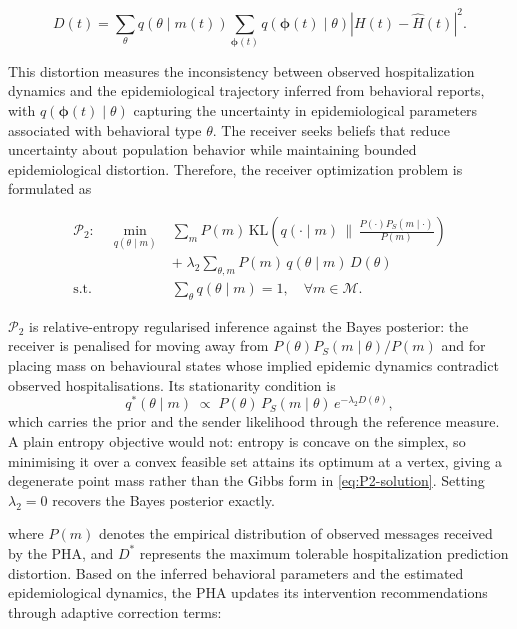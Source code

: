 \documentclass[sigconf,review]{acmart}
\begin{document}
\begin{equation}
D(t)
=
\sum_{\theta}
q(\theta\mid m(t))
\sum_{\boldsymbol{\phi}(t)}
q(\boldsymbol{\phi}(t)\mid\theta)
\left|
H(t)-\widehat H(t)
\right|^2 .
\label{eq_error}
\end{equation}

This distortion measures the inconsistency between observed hospitalization dynamics and the epidemiological trajectory inferred
from behavioral reports, with
$q(\boldsymbol{\phi}(t)\mid\theta)$ capturing the uncertainty in
epidemiological parameters associated with behavioral type $\theta$.
The receiver seeks beliefs that reduce uncertainty about population
behavior while maintaining bounded epidemiological distortion. Therefore,
the receiver optimization problem is formulated as

\begin{equation}
\begin{aligned}
\mathcal{P}_2:
\quad
\min_{q(\theta\mid m)}
&
\sum_{m}
P(m)\,
\mathrm{KL}\!\left(
q(\cdot\mid m)\,\big\|\,
\tfrac{P(\cdot)P_S(m\mid\cdot)}{P(m)}
\right)
\\
&
+\;\lambda_2
\sum_{\theta,m}
P(m)\,
q(\theta\mid m)\,
D(\theta)
\\
\text{s.t.}
&
\sum_{\theta}
q(\theta\mid m)=1,
\quad
\forall m\in\mathcal M .
\end{aligned}
\label{eq:P2}
\end{equation}

\noindent
$\mathcal P_2$ is relative-entropy regularised inference against the Bayes posterior: the
receiver is penalised for moving away from $P(\theta)P_S(m\mid\theta)/P(m)$ and for placing
mass on behavioural states whose implied epidemic dynamics contradict observed
hospitalisations. Its stationarity condition is
\begin{equation}
q^{*}(\theta\mid m)\;\propto\;P(\theta)\,P_S(m\mid\theta)\,e^{-\lambda_2 D(\theta)},
\label{eq:P2-solution}
\end{equation}
which carries the prior and the sender likelihood through the reference measure. A plain
entropy objective would not: entropy is concave on the simplex, so minimising it over a
convex feasible set attains its optimum at a vertex, giving a degenerate point mass rather
than the Gibbs form in \eqref{eq:P2-solution}. Setting $\lambda_2=0$ recovers the Bayes
posterior exactly.

where $P(m)$ denotes the empirical distribution of observed messages received by the PHA, and $D^*$ represents the maximum tolerable
hospitalization prediction distortion.
Based on the inferred behavioral parameters and the estimated epidemiological dynamics, the PHA updates its intervention recommendations through adaptive correction terms:
\end{document}
